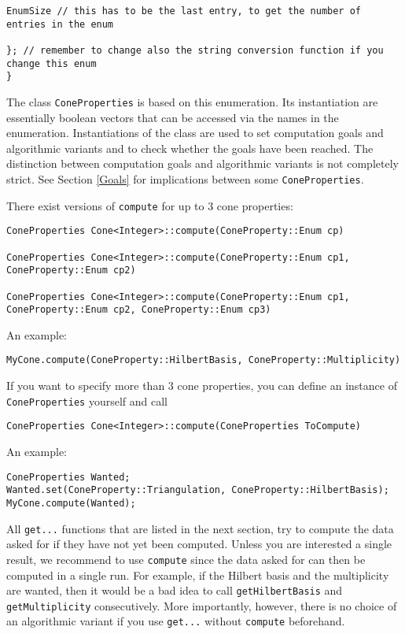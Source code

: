 \documentclass[12pt,a4paper]{scrartcl}
\theoremstyle{definition}
\begin{document}
\begin{small}
\begin{Verbatim}
EnumSize // this has to be the last entry, to get the number of entries in the enum

}; // remember to change also the string conversion function if you change this enum
}
\end{Verbatim}

The class \verb|ConeProperties| is based on this enumeration. Its instantiation are essentially boolean vectors that can be accessed via the names in the enumeration. Instantiations of the class are used to set computation goals and algorithmic variants and to check whether the goals have been reached. The distinction between computation goals and algorithmic variants is not completely strict. See Section \ref{Goals} for implications between some \verb|ConeProperties|.

There exist versions of \verb|compute| for up to $3$ cone properties:
\begin{Verbatim}
ConeProperties Cone<Integer>::compute(ConeProperty::Enum cp)

ConeProperties Cone<Integer>::compute(ConeProperty::Enum cp1, 
ConeProperty::Enum cp2)

ConeProperties Cone<Integer>::compute(ConeProperty::Enum cp1, 
ConeProperty::Enum cp2, ConeProperty::Enum cp3)
\end{Verbatim}

An example:
\begin{Verbatim}
MyCone.compute(ConeProperty::HilbertBasis, ConeProperty::Multiplicity)
\end{Verbatim}

If you want to specify more than $3$ cone properties, you can define an instance of \verb|ConeProperties| yourself and call
\begin{Verbatim}
ConeProperties Cone<Integer>::compute(ConeProperties ToCompute)
\end{Verbatim}

An example:
\begin{Verbatim}
ConeProperties Wanted;
Wanted.set(ConeProperty::Triangulation, ConeProperty::HilbertBasis);
MyCone.compute(Wanted);
\end{Verbatim}

All \verb|get...| functions that are listed in the next section, try to compute the data asked for if they have not yet been computed. Unless you are interested a single result, we recommend to use \verb|compute| since the data asked for can then be computed in a single run. For example, if the Hilbert basis and the multiplicity are wanted, then it would be a bad idea to call \verb|getHilbertBasis| and \verb|getMultiplicity| consecutively. More importantly, however, there is no choice of an algorithmic variant if you use \verb|get...| without \verb|compute| beforehand.


\end{small}
\end{document}
